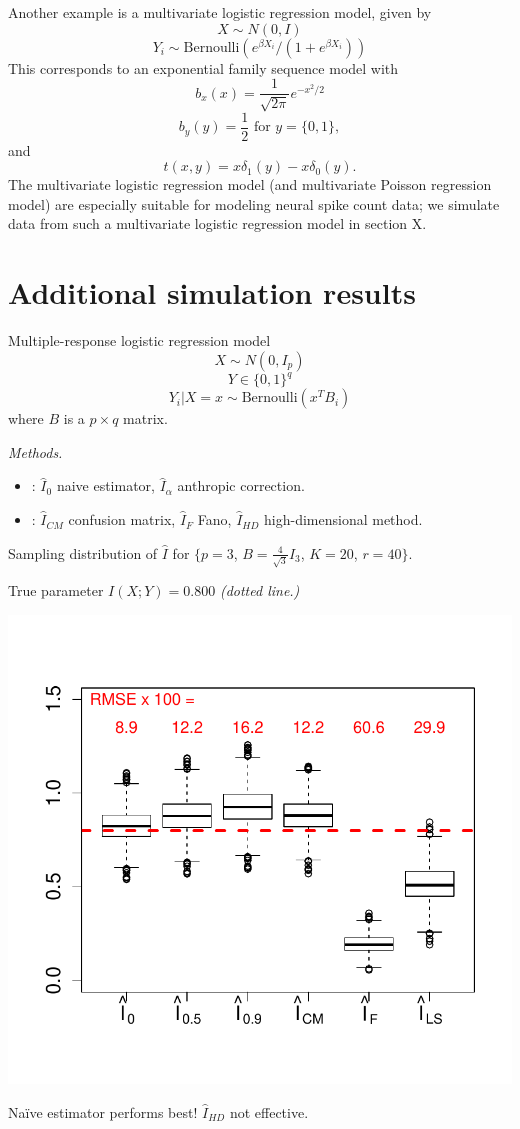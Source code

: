 \documentclass[12pt]{article}
\begin{document}
Another example is a multivariate logistic regression model,
given by
\[
X \sim N(0, I)
\]
\[
Y_i \sim \text{Bernoulli}(e^{\beta X_i}/(1 + e^{\beta X_i}))
\]
This corresponds to an exponential family sequence model with
\[
b_x(x) = \frac{1}{\sqrt{2\pi}} e^{-x^2/2}
\]
\[
b_y(y) = \frac{1}{2}\text{ for }y = \{0, 1\},
\]
and
\[
t(x, y) = x\delta_1(y) - x\delta_0(y).
\]
The multivariate logistic regression model (and multivariate Poisson regression model)
are especially suitable for modeling neural spike count data;
we simulate data from such a multivariate logistic regression model in section X.

\section{Additional simulation results}

Multiple-response logistic regression model
\[
X \sim N(0, I_p)
\]
\[
Y \in \{0,1\}^q
\]
\[
Y_i|X = x \sim \text{Bernoulli}(x^T B_i)
\]
where $B$ is a $p \times q$ matrix.

\emph{Methods.}
\begin{itemize}
\item {}: $\hat{I}_0$ naive estimator, $\hat{I}_\alpha$ anthropic correction.
\item {}: $\hat{I}_{CM}$ confusion matrix, $\hat{I}_F$ Fano, $\hat{I}_{HD}$ high-dimensional method.
\end{itemize}

Sampling distribution of $\hat{I}$ for \small{$\{p = 3$, $B
= \frac{4}{\sqrt{3}} I_3$, $K = 20$, $r = 40\}$.}

True parameter $I(X; Y) = 0.800$ \emph{(dotted line.)}
\begin{center}
\includegraphics[scale = 0.5, clip = true, trim = 0 0.5in 0 0.5in]{../info_theory_sims/fig1.pdf}
\end{center}
Na\"{i}ve estimator performs best!  $\hat{I}_{HD}$ not effective.
\end{document}
